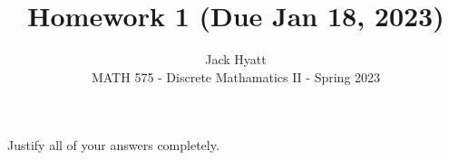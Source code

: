 \documentclass[12pt]{article}
\begin{document}
	
	
	
	\title{Homework 1 (Due Jan 18, 2023)}
	\author{Jack Hyatt\\ %
		MATH 575 - Discrete Mathamatics II - Spring 2023} 
	
	\maketitle
	
	Justify all of your answers completely.\\
	
	\renewcommand{\qedsymbol}{$\blacksquare$}
	
	\medskip 
	
	
	
\end{document}
